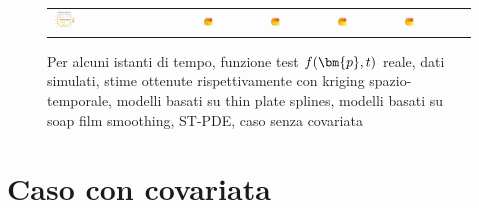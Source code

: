 \documentclass[a4paper,11pt,twoside,openright]{book}							%
\begin{document}
\begin{landscape}
\begin{figure}
\begin{tabular}{lcccccc}
\includegraphics[trim=0.8cm 0.8cm 2.5cm 1.2cm,clip=true,width=0.19\textwidth,valign=t]{Immagini/simulazioni/Dati_tempo4.png}&
\includegraphics[trim=0cm 0cm 0cm 1.8cm,clip=true,width=0.19\textwidth,valign=t]{Immagini/simulazioni/KRIGtempo4.png}&
\includegraphics[trim=0cm 0cm 0cm 1.8cm,clip=true,width=0.19\textwidth,valign=t]{Immagini/simulazioni/TPStempo4.png}&
\includegraphics[trim=0cm 0cm 0cm 1.8cm,clip=true,width=0.19\textwidth,valign=t]{Immagini/simulazioni/SOAPtempo4.png}&
\includegraphics[trim=0cm 0cm 0cm 1.8cm,clip=true,width=0.19\textwidth,valign=t]{Immagini/simulazioni/STSRtempo4.png}

\end{tabular}
\caption{Per alcuni istanti di tempo, funzione test $f(\protect\bm{p},t)$ reale, dati simulati, stime ottenute rispettivamente con kriging spazio-temporale, modelli basati su thin plate splines, modelli basati su soap film smoothing, ST-PDE, caso senza covariata}
\label{fig:confronto_altri_metodi_nocov}
\end{figure}
\end{landscape}

\section{Caso con covariata}
\end{document}
